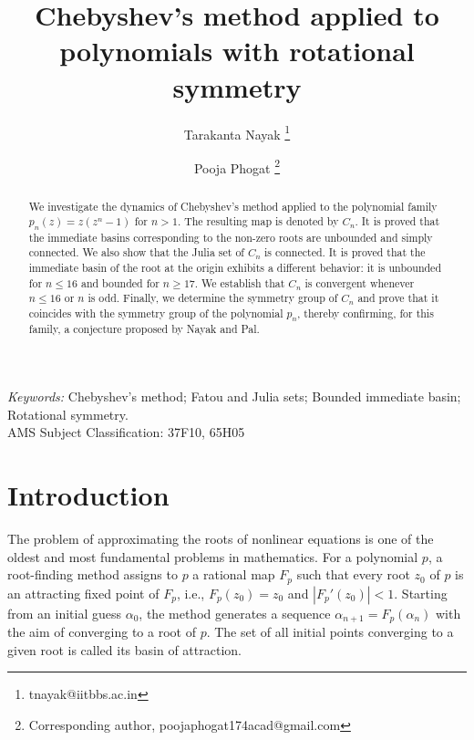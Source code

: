 \documentclass[12pt]{article}
\date{}
\begin{document}
	\title{Chebyshev's method applied to polynomials with rotational symmetry}
	\author[1]{Tarakanta Nayak 
		\footnote{tnayak@iitbbs.ac.in}}
	\author[1]{Pooja Phogat  \footnote{Corresponding author, poojaphogat174acad@gmail.com}}
	\date{}
	\maketitle
	\begin{abstract}
We investigate the dynamics of Chebyshev's method applied to the polynomial family $p_n(z)=z(z^n-1)$ for $n>1$. The resulting map is denoted by  $C_n$. It is proved that the immediate basins corresponding to the non-zero roots are unbounded and simply connected. We also show that the Julia set of $C_n$ is connected. It is proved that the immediate basin of the root at the origin exhibits a different behavior: it is unbounded for $n\leq 16$ and bounded for $n\geq 17$. We establish that $C_n$ is convergent whenever $n\leq 16$ or $n$ is odd. Finally, we determine the symmetry group of $C_n$ and prove that it coincides with the symmetry group of the polynomial $p_n$, thereby confirming, for this family, a conjecture proposed by Nayak and Pal.
	\end{abstract}
	\textit{Keywords:}
	Chebyshev's method; Fatou and Julia sets; Bounded immediate basin; Rotational symmetry.\\
	AMS Subject Classification: 37F10, 65H05
	
	\section{Introduction}
	The problem of approximating the roots of nonlinear equations is one of the oldest and most fundamental problems in mathematics. For a polynomial $p$, a root-finding method assigns to $p$ a rational map $F_p$ such that every root $z_0$ of $p$ is an attracting fixed point of $F_p$, i.e., $F_p (z_0)=z_0$ and  $|F_p '(z_0)|<1$. Starting from an initial guess $\alpha_0$, the method generates a sequence $\alpha_{n+1}=F_p(\alpha_n)$ with the aim of converging to a root of $p$. The set of all initial points converging to a given root is called its basin of attraction.
	
\end{document}
